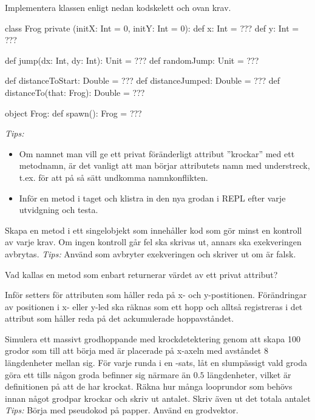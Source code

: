 \Subtask Implementera klassen  enligt nedan kodskelett och ovan krav.

\begin{Code}
class Frog private (initX: Int = 0, initY: Int = 0):
  def x: Int = ???
  def y: Int = ???

  def jump(dx: Int, dy: Int): Unit = ???
  def randomJump: Unit = ???

  def distanceToStart: Double = ???
  def distanceJumped: Double = ???
  def distanceTo(that: Frog): Double = ???

object Frog:
  def spawn(): Frog = ???
\end{Code}
\emph{Tips:}
\begin{itemize} [nolistsep, noitemsep]
\item Om namnet man vill ge ett privat föränderligt attribut ''krockar'' med ett metodnamn, är det vanligt att man börjar attributets namn med understreck, t.ex.  för att på så sätt undkomma namnkonflikten.
\item Inför en metod i taget och klistra in den nya grodan i REPL efter varje utvidgning och testa.
\end{itemize}



\Subtask Skapa en metod  i ett singelobjekt  som innehåller kod som gör minst en kontroll av varje krav. Om ingen kontroll går fel ska  skrivas ut, annars ska exekveringen avbrytas. \emph{Tips:} Använd  som avbryter exekveringen och skriver ut  om  är falsk.

\Subtask Vad kallas en metod som enbart returnerar värdet av ett privat attribut?

\Subtask Inför setters för attributen som håller reda på x- och y-postitionen. Förändringar av positionen i x- eller y-led ska räknas som ett hopp och alltså registreras i det attribut som håller reda på det ackumulerade hoppavståndet.

\Subtask Simulera ett massivt grodhoppande med krockdetektering genom att skapa 100 grodor som till att börja med är placerade på x-axeln med avståndet $8$ längdenheter mellan sig. För varje runda i en -sats, låt en slumpässigt vald groda göra ett  tills någon groda befinner sig närmare än $0.5$ längdenheter, vilket är definitionen på att de har krockat. Räkna hur många looprundor som behövs innan något grodpar krockar och skriv ut antalet. Skriv även ut det totala antalet \\ \emph{Tips:} Börja med pseudokod på papper. Använd en grodvektor.


